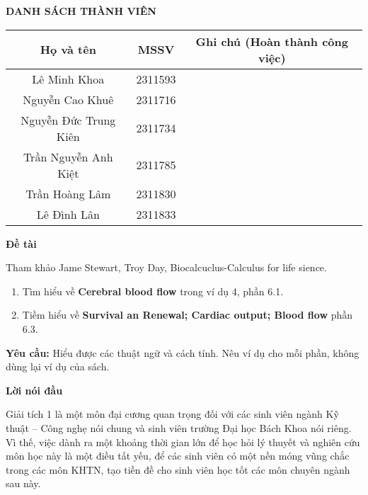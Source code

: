 \documentclass[12pt,a4paper]{article}
\begin{document}

\newpage
\begin{center}
	\textbf{\uppercase{Danh sách thành viên}}
\end{center}
\begin{table}[H]
	\centering
	\def\arraystretch{2.5}
	\begin{tabular}{|c|c|c|}
		\hline
		\textbf{Họ và tên} & \textbf{MSSV} & \textbf{Ghi chú \newline(Hoàn thành công việc)}\\
		\hline
		Lê Minh Khoa & 2311593 & \\
		\hline
		Nguyễn Cao Khuê & 2311716 & \\
		\hline
		Nguyễn Đức Trung Kiên & 2311734 & \\
		\hline
		Trần Nguyễn Anh Kiệt & 2311785 & \\
		\hline
		Trần Hoàng Lâm & 2311830 & \\
		\hline
		Lê Đình Lân & 2311833 & \\
		\hline
	\end{tabular}
\end{table}

\newpage
\begin{center}
	\large\textbf{Đề tài}
\end{center}

Tham khảo Jame Stewart, Troy Day, Biocalcuclus-Calculus for life sience.
\begin{enumerate} [1.]
	\item Tìm hiểu về \textbf{Cerebral blood flow} trong ví dụ 4, phần 6.1.
	\item Tiềm hiểu về \textbf{Survival an Renewal; Cardiac output; Blood flow} phần 6.3.
\end{enumerate}

\textbf{Yêu cầu:} Hiểu được các thuật ngữ và cách tính. Nêu ví dụ cho mỗi phần, không dùng lại ví dụ của sách.

\newpage
\begin{center}
	\large\textbf{Lời nói đầu}
\end{center}

Giải tích 1 là một môn đại cương quan trọng đối với các sinh viên ngành Kỹ thuật – Công nghẹ nói chung và sinh viên trường Đại học Bách Khoa nói riêng. Vì thế, việc dành ra một khoảng thời gian lớn để học hỏi lý thuyết và nghiên cứu môn học này là một điều tất yếu, để các sinh viên có một nền móng vũng chắc trong các môn KHTN, tạo tiền đề cho sinh viên học tốt các môn chuyên ngành sau này.\newline
\end{document}
